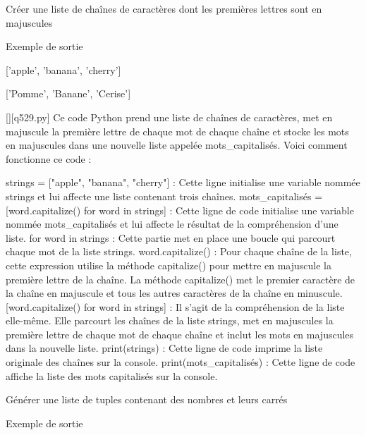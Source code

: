         \question
        Créer une liste de chaînes de caractères dont les premières lettres sont en majuscules

Exemple de sortie

['apple', 'banana', 'cherry']

['Pomme', 'Banane', 'Cerise']
        \par
        \begin{solution}
            \renewcommand{\nomfichier}{q529.py}
            \pythonfile{\chemincode \nomfichier}[][\nomfichier]
            Ce code Python prend une liste de chaînes de caractères, met en majuscule la première lettre de chaque mot de chaque chaîne et stocke les mots en majuscules dans une nouvelle liste appelée mots\_capitalisés. Voici comment fonctionne ce code :

    strings = ["apple", "banana", "cherry"] : Cette ligne initialise une variable nommée strings et lui affecte une liste contenant trois chaînes.
    mots\_capitalisés = [word.capitalize() for word in strings] : Cette ligne de code initialise une variable nommée mots\_capitalisés et lui affecte le résultat de la compréhension d'une liste.
        for word in strings : Cette partie met en place une boucle qui parcourt chaque mot de la liste strings.
        word.capitalize() : Pour chaque chaîne de la liste, cette expression utilise la méthode capitalize() pour mettre en majuscule la première lettre de la chaîne. La méthode capitalize() met le premier caractère de la chaîne en majuscule et tous les autres caractères de la chaîne en minuscule.
        [word.capitalize() for word in strings] : Il s'agit de la compréhension de la liste elle-même. Elle parcourt les chaînes de la liste strings, met en majuscules la première lettre de chaque mot de chaque chaîne et inclut les mots en majuscules dans la nouvelle liste.
    print(strings) : Cette ligne de code imprime la liste originale des chaînes sur la console.
    print(mots\_capitalisés) : Cette ligne de code affiche la liste des mots capitalisés sur la console.
        \end{solution}
        

        \question
        Générer une liste de tuples contenant des nombres et leurs carrés

Exemple de sortie

